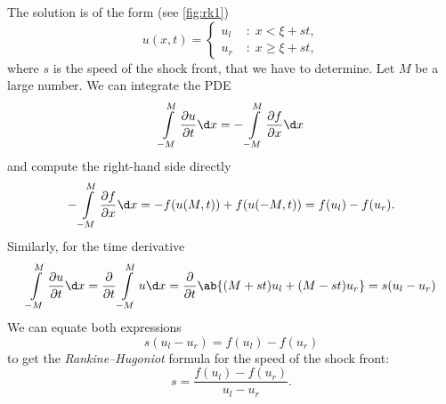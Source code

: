 \documentclass[justified, nobib, a4page]{tufte-handout}
\begin{document}
The solution is of the form (see \cref{fig:rk1})
\[
  u(x,t) = \left\{
  \begin{aligned}
   u_l \; &: \; x < \xi + st,\\
   u_r \; &: \; x \geq \xi + st,
  \end{aligned} \right.
\]
where \(s\) is the speed of the shock front, that we have to determine. Let \(M\) be a large number. 
We can integrate the PDE
\[
  \int\limits_{-M}^{M} \pdv{u}{t} \d x = -  \int\limits_{-M}^{M} \pdv{f}{x} \d x 
\]
and compute the right-hand side directly 
\[
  - \int\limits_{-M}^{M} \pdv{f}{x} \d x  = -f(u(M, t)) + f(u(-M, t)) = f(u_l) - f(u_r).
\]
Similarly, for the time derivative
\[
  \int\limits_{-M}^{M} \pdv{u}{t} \d x
  = \pdv{}{t}\int\limits_{-M}^{M} u \d x
  = \pdv{}{t}\ab\{ (M+st)u_l + (M-st)u_r \} = s(u_l - u_r)
\]
We can equate both expressions
\[
  s(u_l - u_r) = f(u_l) - f(u_r)
\]
to get the \emph{Rankine--Hugoniot} formula for the speed of the shock front:
\[
  s = \frac{f(u_l) - f(u_r)}{u_l - u_r}.
\]

% 
\end{document}
